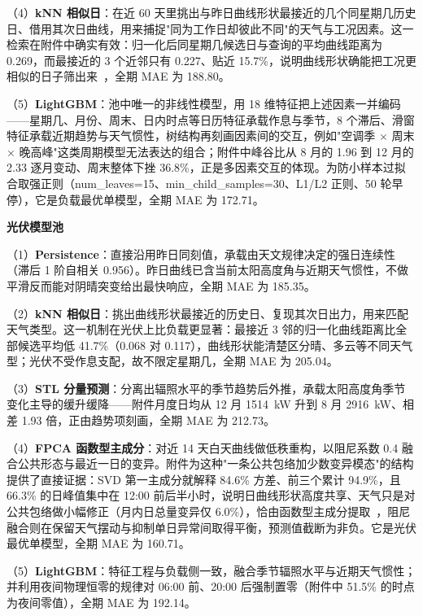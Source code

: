 （4）\textbf{kNN 相似日}：在近 60 天里挑出与昨日曲线形状最接近的几个同星期几历史日、借用其次日曲线，用来捕捉"同为工作日却彼此不同"的天气与工况因素。这一检索在附件中确实有效：归一化后同星期几候选日与查询的平均曲线距离为 0.269，而最接近的 3 个近邻只有 0.227、贴近 15.7\%，说明曲线形状确能把工况更相似的日子筛出来~\cite{akyurek2014}，全期 MAE 为 188.80。

（5）\textbf{LightGBM}：池中唯一的非线性模型，用 18 维特征把上述因素一并编码——星期几、月份、周末、日内时点等日历特征承载作息与季节，8 个滞后、滑窗特征承载近期趋势与天气惯性，树结构再刻画因素间的交互，例如"空调季 $\times$ 周末 $\times$ 晚高峰"这类周期模型无法表达的组合；附件中峰谷比从 8 月的 1.96 到 12 月的 2.33 逐月变动、周末整体下挫 36.8\%，正是多因素交互的体现。为防小样本过拟合取强正则（num\_leaves=15、min\_child\_samples=30、L1/L2 正则、50 轮早停），它是负载最优单模型，全期 MAE 为 172.71。

\textbf{光伏模型池}

（1）\textbf{Persistence}：直接沿用昨日同刻值，承载由天文规律决定的强日连续性（滞后 1 阶自相关 0.956）。昨日曲线已含当前太阳高度角与近期天气惯性，不做平滑反而能对阴晴突变给出最快响应，全期 MAE 为 185.35。

（2）\textbf{kNN 相似日}：挑出曲线形状最接近的历史日、复现其次日出力，用来匹配天气类型。这一机制在光伏上比负载更显著：最接近 3 邻的归一化曲线距离比全部候选平均低 41.7\%（0.068 对 0.117），曲线形状能清楚区分晴、多云等不同天气型；光伏不受作息支配，故不限定星期几，全期 MAE 为 205.04。

（3）\textbf{STL 分量预测}：分离出辐照水平的季节趋势后外推，承载太阳高度角季节变化主导的缓升缓降——附件月度日均从 12 月 1514~kW 升到 8 月 2916~kW、相差 1.93 倍，正由趋势项刻画，全期 MAE 为 212.73。

（4）\textbf{FPCA 函数型主成分}：对近 14 天白天曲线做低秩重构，以阻尼系数 0.4 融合公共形态与最近一日的变异。附件为这种"一条公共包络加少数变异模态"的结构提供了直接证据：SVD 第一主成分就解释 84.6\% 方差、前三个累计 94.9\%，且 66.3\% 的日峰值集中在 12:00 前后半小时，说明日曲线形状高度共享、天气只是对公共包络做小幅修正（月内日总量变异仅 6.0\%），恰由函数型主成分提取~\cite{wagnermuns2018}，阻尼融合则在保留天气摆动与抑制单日异常间取得平衡，预测值截断为非负。它是光伏最优单模型，全期 MAE 为 160.71。

（5）\textbf{LightGBM}：特征工程与负载侧一致，融合季节辐照水平与近期天气惯性；并利用夜间物理恒零的规律对 06:00 前、20:00 后强制置零（附件中 51.5\% 的时点为夜间零值），全期 MAE 为 192.14。




